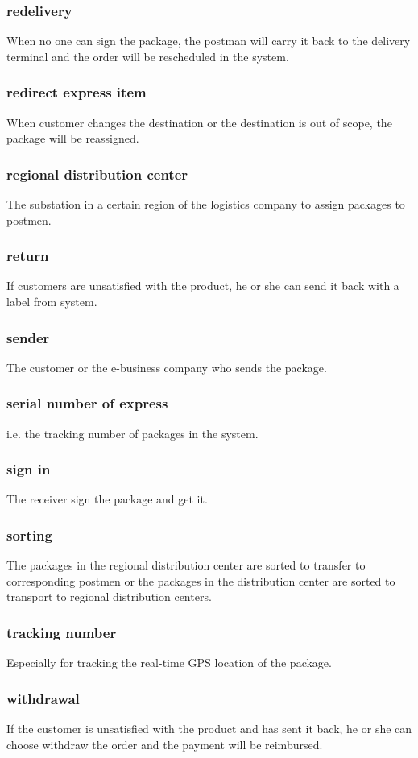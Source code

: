 \documentclass[12pt]{scrreprt}
\begin{document}
\begin{spacing}{0.7}
\subsubsection{redelivery}
When no one can sign the package, the postman will carry it back to
the delivery terminal and the order will be rescheduled in the system.
\subsubsection{redirect express item}
When customer changes the destination or the destination is out of scope,
the package will be reassigned.
\subsubsection{regional distribution center}
The substation in a certain region of the logistics company to assign
packages to postmen.
\subsubsection{return}
If customers are unsatisfied with the product, he or she can send it back
with a label from system.
\subsubsection{sender}
The customer or the e-business company who sends the package.
\subsubsection{serial number of express}
i.e. the tracking number of packages in the system.
\subsubsection{sign in}
The receiver sign the package and get it.
\subsubsection{sorting}
The packages in the regional distribution center are sorted to transfer to
corresponding postmen or the packages in the distribution center are sorted to
transport to regional distribution centers.
\subsubsection{tracking number}
Especially for tracking the real-time GPS location of the package.
\subsubsection{withdrawal}
If the customer is unsatisfied with the product and has sent it back,
he or she can choose withdraw the order and the payment will be reimbursed.
\end{spacing}
\end{document}
